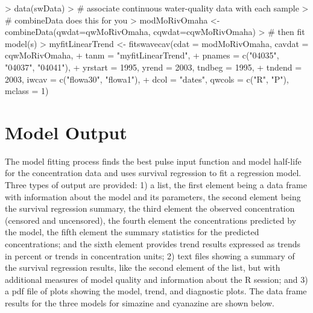 \documentclass[11pt]{article}
\begin{document}
\begin{Schunk}
\begin{Sinput}
> data(swData)
> # associate continuous water-quality data with each sample
> # combineData does this for you
> modMoRivOmaha <- combineData(qwdat=qwMoRivOmaha, cqwdat=cqwMoRivOmaha)
> # then fit model(s)
> myfitLinearTrend <- fitswavecav(cdat = modMoRivOmaha, cavdat = cqwMoRivOmaha, 
+                                 tanm = "myfitLinearTrend", 
+                                 pnames = c("04035", "04037", "04041"), 
+                                 yrstart = 1995, yrend = 2003, tndbeg = 1995, 
+                                 tndend = 2003, iwcav = c("flowa30", "flowa1"), 
+                                 dcol = "dates", qwcols = c("R", "P"), mclass = 1)
\end{Sinput}
\begin{Soutput}

\end{Soutput}
\end{Schunk}

\section{Model Output}
The model fitting process finds the best pulse input function and model half-life for the concentration data and uses survival regression to fit a regression model.  Three types of output are provided: 1) a list, the first element being a data frame with information about the model and its parameters, the second element being the survival regression summary, the third element the observed concentration (censored and uncensored), the fourth element the concentrations predicted by the model, the fifth element the summary statistics for the predicted concentrations; and the sixth element provides trend results expressed as trends in percent or trends in concentration units;  2) text files showing a summary of the survival regression results, like the second element of the list, but with  additional measures of model quality and information about the R session; and 3) a pdf file of plots showing the model, trend, and diagnostic plots.  The data frame results for the three models for simazine and cyanazine are shown below.
\vspace{5 mm}
\end{document}
